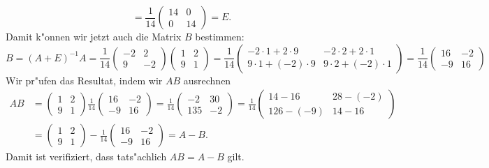\begin{loesung}
\[=
\frac1{14}
\begin{pmatrix}
14& 0\\
 0&14
\end{pmatrix}
=E.
\]
Damit k"onnen wir jetzt auch die Matrix $B$ bestimmen:
\[
B=(A+E)^{-1}A
=
\frac1{14}
\begin{pmatrix}
-2& 2\\
 9&-2
\end{pmatrix}
\begin{pmatrix}
1&2\\
9&1
\end{pmatrix}
=
\frac1{14}
\begin{pmatrix}
-2 \cdot 1 +   2  \cdot 9 & -2 \cdot 2 +   2  \cdot 1 \\
 9 \cdot 1 + (-2) \cdot 9 &  9 \cdot 2 + (-2) \cdot 1
\end{pmatrix}
=
\frac1{14}
\begin{pmatrix}
16& -2\\
-9&16
\end{pmatrix}
\]
Wir pr"ufen das Resultat, indem wir $AB$ ausrechnen
\begin{align*}
AB&=
\begin{pmatrix}
1&2\\
9&1
\end{pmatrix}
\frac1{14}
\begin{pmatrix}
16& -2\\
-9& 16
\end{pmatrix}
=
\frac1{14}
\begin{pmatrix}
 -2&30\\
135&-2
\end{pmatrix}
=
\frac1{14}
\begin{pmatrix}
 14 -  16 &28 -(-2)\\
126 - (-9)&14 - 16
\end{pmatrix}
\\
&=
\begin{pmatrix}
 1 & 2\\
 9 & 1
\end{pmatrix}
-
\frac1{14}
\begin{pmatrix}
16& -2\\
-9& 16
\end{pmatrix}
=
A-B.
\end{align*}
Damit ist verifiziert, dass tats"achlich $AB=A-B$ gilt.
\end{loesung}

